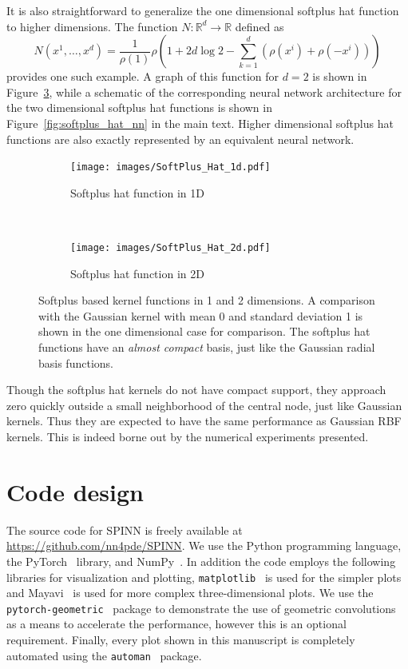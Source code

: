\documentclass[12pt]{article}
\newcommand{\code}[1]{\lstinline{#1}}
\begin{document}
It is also straightforward to generalize the one dimensional softplus hat function to higher dimensions. The function $N:\mathbb{R}^d \to \mathbb{R}$ defined as 
\begin{equation} \label{eq:hat_softplus_nd1}
N(x^1, \ldots, x^d) = \frac{1}{\rho(1)}\rho\left(1 + 2d\log 2 - \sum_{k=1}^d (\rho(x^i) + \rho(-x^i))\right)
\end{equation}
provides one such example. A graph of this function for $d = 2$ is shown in Figure~\ref{fig:softplus_hat_2d}, while a schematic of the corresponding neural network architecture for the two dimensional softplus hat functions is shown in Figure~\ref{fig:softplus_hat_nn} in the main text. Higher dimensional softplus hat functions are also exactly represented by an equivalent neural network. 

\begin{figure}[htpb]
\begin{subfigure}{0.4\textwidth}
\centering
\texttt{[image: images/SoftPlus\_Hat\_1d.pdf]}
\caption{Softplus hat function in 1D}
\label{fig:softplus_hat_1d}
\end{subfigure}
~
\begin{subfigure}{0.6\textwidth}
\centering
\texttt{[image: images/SoftPlus\_Hat\_2d.pdf]}
\caption{Softplus hat function in 2D}
\label{fig:softplus_hat_2d}
\end{subfigure}
\caption{Softplus based kernel functions in 1 and 2 dimensions. A comparison with the Gaussian kernel with mean 0 and standard deviation 1 is shown in the one dimensional case for comparison. The softplus hat functions have an \emph{almost compact} basis, just like the Gaussian radial basis functions.}
\end{figure}

Though the softplus hat kernels do not have compact support, they approach zero quickly outside a small neighborhood of the central node, just like Gaussian kernels. Thus they are expected to have the same performance as Gaussian RBF kernels. This is indeed borne out by the numerical experiments presented.

\section{Code design}

\begin{sloppypar}
The source code for SPINN is freely available at \url{https://github.com/nn4pde/SPINN}.  We use the Python programming language, the PyTorch~\cite{pytorch} library, and NumPy~\cite{numpy}.  In addition the code employs the following libraries for visualization and plotting, \code{matplotlib}~\cite{mpl} is used for the simpler plots and Mayavi~\cite{mayavi} is used for more complex three-dimensional plots.  We use the \code{pytorch-geometric}~\cite{pytorch_geometric} package to demonstrate the use of geometric convolutions as a means to accelerate the performance, however this is an optional requirement.  Finally, every plot shown in this manuscript is completely automated using the \code{automan}~\cite{automan:2018} package. 
\end{sloppypar}
\end{document}
